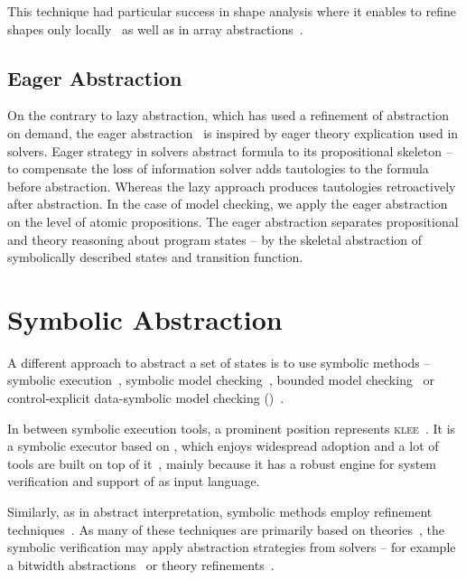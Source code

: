 This technique had particular success in shape analysis where it enables to
refine shapes only locally~\cite{Henzinger2003,Beyer2006a} as well as in array
abstractions~\cite{Alberti2012, Alberti2012b}.

\subsection{Eager Abstraction}

On the contrary to lazy abstraction, which has used a refinement of abstraction
on demand, the eager abstraction~\cite{McMillan2018} is inspired by eager
theory explication used in \smt solvers. Eager strategy in \smt solvers
abstract formula to its propositional skeleton -- to compensate the loss of
information \smt solver adds tautologies to the formula before abstraction.
Whereas the lazy approach produces tautologies retroactively after abstraction.
In the case of model checking, we apply the eager abstraction on the level of
atomic propositions. The eager abstraction separates propositional and theory
reasoning about program states -- by the skeletal abstraction of symbolically
described states and transition function.

\section{Symbolic Abstraction}

A different approach to abstract a set of states is to use symbolic methods --
symbolic execution~\cite{King76, Cadar2013symbolic, Baldoni2018survey}, symbolic model
checking~\cite{Clarke96, McMillan93, Cimatti20}, bounded model
checking~\cite{Biere2003bounded} or control-explicit data-symbolic model
checking (\ceds)~\cite{Mrazek2016}.

In between symbolic execution tools, a prominent position represents
\textsc{klee}~\cite{Cadar2008klee}. It is a symbolic executor based on \llvm,
which enjoys widespread adoption and a lot of tools are built on top of
it~\cite{Beyer2018Klee, Chalupa2018, Chen2018, Menezes2018}, mainly because it
has a robust engine for system verification and support of \llvm as input
language.

Similarly, as in abstract interpretation, symbolic methods employ refinement
techniques~\cite{Beyer2016}. As many of these techniques are primarily based on
\smt theories~\cite{Beyer2018}, the symbolic verification may apply abstraction
strategies from solvers -- for example a bitwidth
abstractions~\cite{Jonavs2018} or theory refinements~\cite{Hyvarinen2017}.

